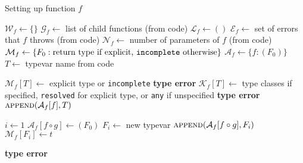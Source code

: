 \documentclass[10pt]{article}
\begin{document}
\begin{algorithm}
	\caption{Setting up function $f$}
	\begin{algorithmic}[1]
		\Statex
			\State $\mathcal{W}_f \gets \{\}$ 
			\State $\mathcal{G}_f \gets $ list of child functions (from code)
			\State $\mathcal{L}_f \gets ()$ 
			\State $\mathcal{E}_f \gets $ set of errors that $f$ throws (from
			code)
			\State $\mathcal{N}_f \gets $ number of parameters of $f$ (from
			code)
			\State $\mathcal{M}_f \gets \{F_0 : \textrm{return type if explicit,
				\texttt{incomplete} otherwise} \}$ 
				\State $\mathcal{A}_f \gets \{ f : (F_0) \}$ 
				\State $T \gets $ typevar name from code
				 

					\State $\mathcal{M}_f[T] \gets $ explicit type or
						\texttt{incomplete}
						\State \Return \textbf{type error}
					\EndIf
					\State $\mathcal{K}_f[T] \gets $ type classes if
					specified, \texttt{resolved} for explicit type, or
					\texttt{any} if unspecified 
						\State \Return \textbf{type error}
					\EndIf
				\EndIf
				\State $\Call{append}{\mathcal{A}_f[f], T}$ 
			\EndFor

			\State $i \gets 1$ 
					\State $\mathcal{A}_f[f \circ g] \gets (F_0)$
				\EndIf
						\State $F_i \gets $ new typevar
						\State $\Call{append}{\mathcal{A}_f[f \circ g], F_i}$ 
						\State $\mathcal{M}_f[F_i] \gets t$ 

							\State \Return \textbf{type error}
						\EndIf


\end{algorithmic}
\end{algorithm}
\end{document}
